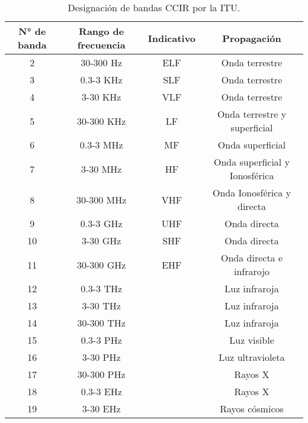 \documentclass[
	12pt, %
	fleqn, %
	a4paper, %
	oneside, %
]{LegrandOrangeBook}
\begin{document}
\begin{table}[H]
\centering
\begin{tabular}{|c|c|c|c|}
\hline
\rowcolor[HTML]{9698ED} 
N° de banda & Rango de frecuencia & Indicativo & Propagación                    \\ \hline
2           & 30-300 Hz           & ELF        & Onda terrestre                 \\ \hline
3           & 0.3-3 KHz           & SLF        & Onda terrestre                 \\ \hline
4           & 3-30 KHz            & VLF        & Onda terrestre                 \\ \hline
5           & 30-300 KHz          & LF         & Onda terrestre y superficial   \\ \hline
6           & 0.3-3 MHz           & MF         & Onda superficial               \\ \hline
7           & 3-30 MHz            & HF         & Onda superficial y Ionosférica \\ \hline
8           & 30-300 MHz          & VHF        & Onda Ionosférica y directa     \\ \hline
9           & 0.3-3 GHz           & UHF        & Onda directa                   \\ \hline
10          & 3-30 GHz            & SHF        & Onda directa                   \\ \hline
11          & 30-300 GHz          & EHF        & Onda directa e infrarojo       \\ \hline
12          & 0.3-3 THz           &            & Luz infraroja                  \\ \hline
13          & 3-30 THz            &            & Luz infraroja                  \\ \hline
14          & 30-300 THz          &            & Luz infraroja                  \\ \hline
15          & 0.3-3 PHz           &            & Luz visible                    \\ \hline
16          & 3-30 PHz            &            & Luz ultravioleta               \\ \hline
17          & 30-300 PHz          &            & Rayos X                        \\ \hline
18          & 0.3-3 EHz           &            & Rayos X                        \\ \hline
19          & 3-30 EHz            &            & Rayos cósmicos                 \\ \hline
\end{tabular}
\caption{Designación de bandas CCIR por la ITU.}
\end{table}
\end{document}
